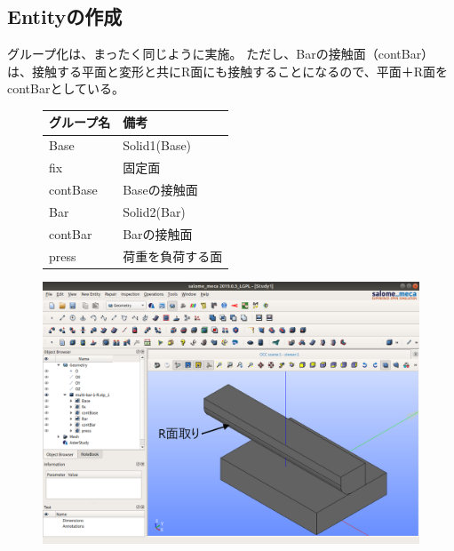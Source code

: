 \documentclass[a4j,11pt,twoside,openany,dvipdfmx]{jsarticle}
\begin{document}
\subsection{Entityの作成}
グループ化は、まったく同じように実施。
ただし、Barの接触面（contBar）は、接触する平面と変形と共にR面にも接触することになるので、平面＋R面をcontBarとしている。
\begin{figure}[H]
	\begin{minipage}{0.34\hsize}
		\begin{table}[H]
			\centering
			\begin{tabular}{@{}ll@{}}
				\toprule
				グループ名 & 備考             \\\midrule
				Base       & Solid1(Base)     \\
				fix        & 固定面           \\
				contBase   & Baseの接触面     \\
				Bar        & Solid2(Bar)      \\
				contBar    & Barの接触面      \\
				press      & 荷重を負荷する面 \\\bottomrule
			\end{tabular}
		\end{table}
	\end{minipage}
	\begin{minipage}{0.64\hsize}
		\centering
		\includegraphics[width=0.9\linewidth]{fig/fig004.png}
	\end{minipage}
\end{figure}
\end{document}
